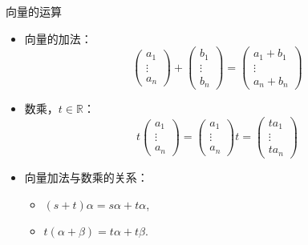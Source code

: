 \begin{frame}

\begin{block}{向量的运算}
\begin{itemize}
\item<1-> 向量的加法：
\[\begin{pmatrix} a_1 \\ \vdots \\ a_n \end{pmatrix} + \begin{pmatrix} b_1 \\ \vdots \\ b_n \end{pmatrix} = \begin{pmatrix} a_1 + b_1 \\ \vdots \\ a_n + b_n \end{pmatrix}\]
\item<2-> 数乘，$t\in\mathbb{R}$：
\[t \begin{pmatrix} a_1 \\ \vdots \\ a_n \end{pmatrix} = \begin{pmatrix} a_1 \\ \vdots \\ a_n \end{pmatrix}t = \begin{pmatrix} ta_1 \\ \vdots \\ ta_n \end{pmatrix}\]
\item<3-> 向量加法与数乘的关系：
\begin{itemize}
\item $(s+t)\alpha = s\alpha + t\alpha$,
\item $t(\alpha + \beta) = t\alpha + t\beta$.
\end{itemize}
\end{itemize}
\end{block}

\end{frame}



